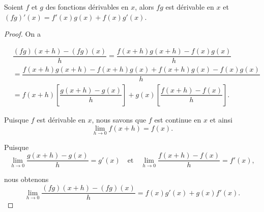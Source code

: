 \documentclass[a4paper,12pt]{article}
\begin{document}
\begin{prop}
   \tcblower
   Soient $f$ et $g$ des fonctions dérivables en $x$, alors $fg$ est dérivable en $x$ et $(fg)'(x)=f'(x)g(x)+f(x)g'(x)$. 

   \medskip

   \begin{proof}
   On a 
	   \medskip

 $\begin{aligned}
&\dfrac{(fg)(x+h) - (fg)(x)}{h} = \dfrac{f(x+h)g(x+h) - f(x)g(x)}{h}\\
&=\dfrac{f(x+h)g(x+h)-f(x+h)g(x) + f(x+h)g(x)- f(x)g(x)}{h}\\
&=f(x+h)\left[\dfrac{g(x+h) - g(x)}{h}\right] + g(x)\left[\dfrac{f(x+h) - f(x)}{h}\right].
   	\end{aligned}$
   	
	\medskip

Puisque $f$ est dérivable en $x$, nous savons que $f$ est continue en $x$ et ainsi
   	$$\lim_{h \to 0} f(x+h) = f(x).$$
   	
   	Puisque 
   	$$\lim_{h \to 0} \frac{g(x+h) - g(x)}{h} = g'(x) \quad \text{et} \quad \lim_{h \to 0} \frac{f(x+h) - f(x)}{h} = f'(x),$$
   	
   	nous obtenons
   	$$\lim_{h \to 0} \frac{(fg)(x+h) - (fg)(x)}{h} = f(x)g'(x) + g(x)f'(x).$$
   \end{proof}
\end{prop}
\end{document}
